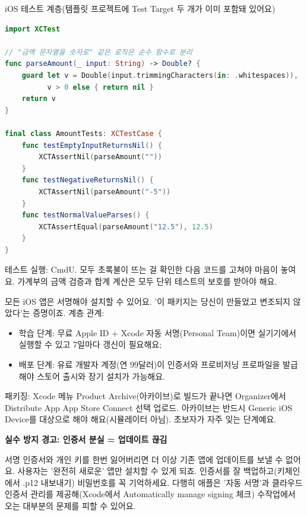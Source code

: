 \begin{center}\small\color{gray}iOS 테스트 계층(템플릿 프로젝트에 Test Target 두 개가 이미 포함돼 있어요)\end{center}

\begin{lstlisting}[language=Swift]
import XCTest

// "금액 문자열을 숫자로" 같은 로직은 순수 함수로 분리
func parseAmount(_ input: String) -> Double? {
    guard let v = Double(input.trimmingCharacters(in: .whitespaces)),
          v > 0 else { return nil }
    return v
}

final class AmountTests: XCTestCase {
    func testEmptyInputReturnsNil() {
        XCTAssertNil(parseAmount(""))
    }
    func testNegativeReturnsNil() {
        XCTAssertNil(parseAmount("-5"))
    }
    func testNormalValueParses() {
        XCTAssertEqual(parseAmount("12.5"), 12.5)
    }
}
\end{lstlisting}

테스트 실행: CmdU. 모두 초록불이 뜨는 걸 확인한 다음 코드를 고쳐야 마음이 놓여요. 가계부의 금액 검증과 합계 계산은 모두 단위 테스트의 보호를 받아야 해요.


모든 iOS 앱은 서명해야 설치할 수 있어요. '이 패키지는 당신이 만들었고 변조되지 않았다'는 증명이죠. 계층 관계:

\begin{itemize}
  \item 학습 단계: 무료 Apple ID + Xcode 자동 서명(Personal Team)이면 실기기에서 실행할 수 있고 7일마다 갱신이 필요해요;
  \item 배포 단계: 유료 개발자 계정(연 99달러)이 인증서와 프로비저닝 프로파일을 발급해야 스토어 출시와 장기 설치가 가능해요.
\end{itemize}

패키징: Xcode 메뉴 Product Archive(아카이브)로 빌드가 끝나면 Organizer에서 Distribute App App Store Connect 선택 업로드. 아카이브는 반드시 Generic iOS Device를 대상으로 해야 해요(시뮬레이터 아님). 초보자가 자주 잊는 단계예요.

\textbf{실수 방지 경고: 인증서 분실 = 업데이트 끊김}\par

서명 인증서와 개인 키를 한번 잃어버리면 더 이상 기존 앱에 업데이트를 보낼 수 없어요. 사용자는 '완전히 새로운' 앱만 설치할 수 있게 되죠. 인증서를 잘 백업하고(키체인에서 .p12 내보내기) 비밀번호를 꼭 기억하세요. 다행히 애플은 '자동 서명'과 클라우드 인증서 관리를 제공해(Xcode에서 Automatically manage signing 체크) 수작업에서 오는 대부분의 문제를 피할 수 있어요.

